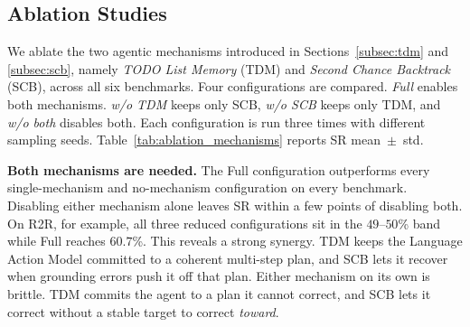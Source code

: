 \documentclass[conference]{IEEEtran}
\begin{document}
\subsection{Ablation Studies}



\label{subsec:ablation_mechanisms}

We ablate the two agentic mechanisms introduced in Sections~\ref{subsec:tdm}
and \ref{subsec:scb}, namely \emph{TODO List Memory} (TDM) and \emph{Second
Chance Backtrack} (SCB), across all six benchmarks. Four configurations are
compared. \emph{Full} enables both mechanisms. \emph{w/o TDM} keeps only SCB,
\emph{w/o SCB} keeps only TDM, and \emph{w/o both} disables both. Each
configuration is run three times with different sampling seeds.
Table~\ref{tab:ablation_mechanisms} reports SR mean~$\pm$~std.

\noindent\textbf{Both mechanisms are needed.}
The Full configuration outperforms every single-mechanism and
no-mechanism configuration on every benchmark.  Disabling either mechanism
alone leaves SR within a few points of
disabling both.  On R2R, for example, all three
reduced configurations sit in the $49$--$50$\% band while Full
reaches $60.7$\%.  This reveals a strong
synergy.  TDM keeps the Language Action Model
committed to a coherent multi-step plan, and SCB lets it recover
when grounding errors push it off that plan.
Either mechanism on its own is
brittle.  TDM commits the agent to a plan it
cannot correct, and SCB lets it correct without a stable target to
correct \emph{toward}.
\end{document}

